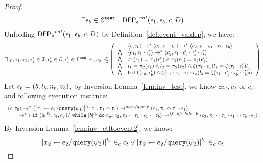 \begin{proof}
 \[
   \exists \mathtt{\epsilon}_b \in \mathcal{E}^{\mathtt{{test}}} ~.~ \mathsf{DEP_{\mathtt{e}}}^{val}(\mathtt{\epsilon}_1, \mathtt{\epsilon}_b, c, D)
 \]
 Unfolding $\mathsf{DEP_{\mathtt{e}}}^{val}(\mathtt{\epsilon}_1, \mathtt{\epsilon}_b, c, D)$ by Definition~\ref{def:event_valdep}, we have:
\[
\exists \vtrace_0,
\vtrace_1, \vtrace_2, \vtrace_2' \in \mathcal{T}, \event_b' \in \eventset, \event_1' \in \eventset^{\asn}, 
{c}_1, {c}_2,  {c}_2'.
  \left(
  \begin{array}{ll}   
 & \config{{c}, \vtrace_0} \rightarrow^{*} 
\config{{c}_1, \vtrace_1 \cdot \event_1}  \rightarrow^{*} 
  \config{{c}_2,  \vtrace_1 \cdot \event_1 \cdot \vtrace_b \cdot \event_b } 
 \\ 
 \bigwedge &
  \config{{c}_1, \vtrace_1 \cdot \event_1'}  \rightarrow^{*} 
  \config{{c}_2',  \vtrace_1 \cdot \event_1' \cdot \vtrace_b' \cdot \event_b' } 
\\
\bigwedge &  \pi_1(\event_1) = \pi_1(\event_1') \land \pi_2(\event_1) = \pi_2(\event_1') \\
\bigwedge & l_1 = \pi_2(\event_1) \land l_2 = \pi_2(\event_2)
\land \vcounter(\vtrace_1 \cdot \event_1) l_1 = \vcounter(\vtrace_1 \cdot \event_1')l_1 
\\
\bigwedge & 
\diff(\event_b,\event_b' ) \land 
\vcounter(\vtrace_1 \cdot \event_1 \cdot \vtrace_b \cdot \event_b) l_b
= 
\vcounter(\vtrace_1 \cdot \event_1' \cdot \vtrace_b'\cdot \event_b') l_b\\
\end{array}
\right)
 \]
%
 Let $\mathtt{\epsilon}_b = (b, l_b, n_b, v_b)$, by {Inversion Lemma~\ref{lem:inv_test}},
we know $\exists  c_t, c_f$ or $c_w$ and following execution instance:
\begin{equation}
\label{eq:ctldep_inv1}
  \begin{array}{l}   
\langle {c}, \mathtt{\tau}_0 \rangle \rightarrow^{*} 
\langle [\mathrel{ {x}_1 \leftarrow e_1 / {\tt query}(\psi_1) }]^{l_1} ; {c}_1, \mathtt{\tau}_0 \smallfrown \mathtt{\tau}_1 \rangle  
\rightarrow^{assn/query}
 \langle c_1, \mathtt{\tau}_0 \smallfrown \mathtt{\tau}_1 \cdot \mathtt{\epsilon}_1 \rangle 
 \\ \qquad 
 \rightarrow^{*} 
  \langle \;\mathtt{if}\;([b]{}^{l_b}, c_t, c_f) / \;\mathtt{while}\; [b]{}^{l_b} \;\mathtt{do}\; c_w; {c}_2, 
  \mathtt{\tau}_0 \smallfrown \mathtt{\tau}_1 \cdot \mathtt{\epsilon}_1 \smallfrown \mathtt{\tau}_b \rangle 
  \rightarrow^{if-b / while-b} 
  \langle {c}_3,  \mathtt{\tau}_0 \smallfrown \mathtt{\tau}_1 \cdot \mathtt{\epsilon}_1 \smallfrown \mathtt{\tau}_b \cdot \mathtt{\epsilon}_b \rangle 
\end{array}
\end{equation}
%
By Inversion Lemma~\ref{lem:inv_ctltoevent2}, we know:
\[
  [\mathrel{ {x}_2 \leftarrow e_2 / {\tt query}(\psi_2) }]^{l_2} \in_c c_t
  \lor
  [\mathrel{ {x}_2 \leftarrow e_2 / {\tt query}(\psi_2) }]^{l_2} \in_c c_t
\]
\end{proof}
